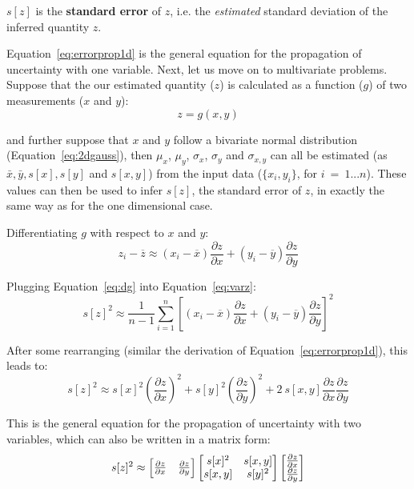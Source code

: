 $s[z]$ is the \textbf{standard error} of $z$, i.e.  the
\textit{estimated} standard deviation of the inferred quantity $z$.\medskip

Equation~\ref{eq:errorprop1d} is the general equation for the
propagation of uncertainty with one variable.  Next, let us move on to
multivariate problems. Suppose that the our estimated quantity ($z$)
is calculated as a function ($g$) of two measurements ($x$ and $y$):
\begin{equation}
z = g(x,y)
\label{eq:zfxy}
\end{equation}

and further suppose that $x$ and $y$ follow a bivariate normal
distribution (Equation~\ref{eq:2dgauss}), then $\mu_x$, $\mu_{y}$,
$\sigma_{x}$, $\sigma_{y}$ and $\sigma_{x,y}$ can all be estimated (as
$\bar{x}, \bar{y}, s[x], s[y]$ and $s[x,y]$) from the input data
($\{x_i, y_i\}$, for $i~=~1...n$). These values can then be used to
infer $s[z]$, the standard error of $z$, in exactly the same way as
for the one dimensional case.\medskip

Differentiating $g$ with respect to $x$ and $y$:
\begin{equation}
  z_i - \overline{z} \approx (x_i-\overline{x}) \frac{\partial z}{\partial x} +
  (y_i-\overline{y}) \frac{\partial z}{\partial y}
  \label{eq:dg}
\end{equation}

Plugging Equation~\ref{eq:dg} into Equation~\ref{eq:varz}:
\begin{equation}
  s[z]^2 \approx \frac{1}{n-1} \sum_{i=1}^{n} \left[
    (x_i-\overline{x}) \frac{\partial z}{\partial x} +
    (y_i-\overline{y}) \frac{\partial z}{\partial y} \right]^2
\end{equation}

After some rearranging (similar the derivation of
Equation~\ref{eq:errorprop1d}), this leads to:
\begin{equation}
  s[z]^2 \approx s[x]^2 \left(\frac{\partial z}{\partial x}\right)^2 +
  s[y]^2 \left(\frac{\partial z}{\partial y}\right)^2 +
  2~s[x,y] \frac{\partial z}{\partial x} \frac{\partial z}{\partial y}
  \label{eq:errorprop2d}
\end{equation}

This is the general equation for the propagation of uncertainty with
two variables, which can also be written in a matrix form:
\begin{equation}
s[z]^2 \approx
\left[
  \begin{array}{@{}cc@{}}
\frac{\partial z}{\partial x} & \frac{\partial z}{\partial y}
\end{array}
\right]
\left[
\begin{array}{@{}cc@{}}
s[x]^2 & s[x,y]\\
s[x,y] & s[y]^2
\end{array}
\right]
\left[
\begin{array}{@{}c@{}}
\frac{\partial z}{\partial x} \\
\frac{\partial z}{\partial y}
\end{array}
\right]
\label{eq:errorprop2dmatrix}
\end{equation}


